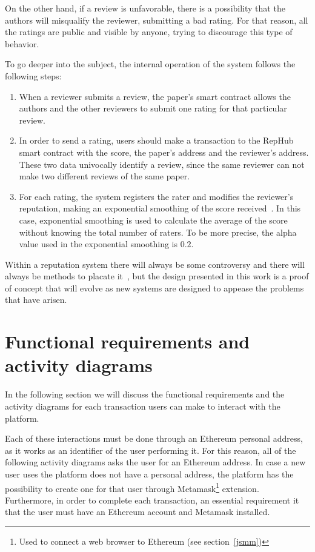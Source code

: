 On the other hand, if a review is unfavorable, there is a possibility that the
authors will misqualify the reviewer, submitting a bad rating. For that reason,
all the ratings are public and visible by anyone, trying to discourage this type
of behavior.

To go deeper into the subject, the internal operation of the system follows the
following steps:

\begin{enumerate}
\item When a reviewer submits a review, the paper's smart contract allows the
  authors and the other reviewers to submit one rating for that particular
  review.
  
\item In order to send a rating, users should make a transaction to the RepHub
  smart contract with the score, the paper's address and the reviewer's address.
  These two data univocally identify a review, since the same reviewer can not
  make two different reviews of the same paper.
  
\item For each rating, the system registers the rater and modifies the
  reviewer's reputation, making an exponential smoothing of the score
  received~\cite{gardner1985exponential}. In this case, exponential smoothing is
  used to calculate the average of the score without knowing the total number of
  raters. To be more precise, the alpha value used in the exponential smoothing
  is $0.2$.
\end{enumerate}

Within a reputation system there will always be some controversy and there will
always be methods to placate it~\cite{dellarocas2000immunizing}, but the design
presented in this work is a proof of concept that will evolve as new systems are
designed to appease the problems that have arisen.


\section{Functional requirements and activity diagrams}
\label{sec:funct-requ-activ}

In the following section we will discuss the functional requirements and the
activity diagrams for each transaction users can make to interact with the
platform.

Each of these interactions must be done through an Ethereum personal address, as
it works as an identifier of the user performing it. For this reason, all of the
following activity diagrams asks the user for an Ethereum address. In case a new
user uses the platform does not have a personal address, the platform has the
possibility to create one for that user through Metamask\footnote{Used to
  connect a web browser to Ethereum (see section~\ref{jsmm})} extension.
Furthermore, in order to complete each transaction, an essential requirement it
that the user must have an Ethereum account and Metamask installed.

